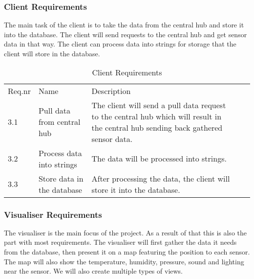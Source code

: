 \documentclass[../document]{subfiles}
\begin{document}
\subsubsection{Client Requirements}
The main task of the client is to take the data from the central hub and store it into the database. The client will send requests to the central hub and get sensor data in that way. The client can process data into strings for storage that the client will store in the database.

\begin{table}[H]
\caption{Client Requirements}
\centering
\begin{tabularx}{\textwidth}{|l|X|X|l|X|}
\hline
\\ \hline Req.nr
&Name
&Description
\\ \hline3.1
&Pull data from central hub
&The client will send a pull data request to the central hub which will result in the central hub sending back gathered sensor data.
\\ \hline3.2
&Process data into strings
&The data will be processed into strings.
\\ \hline3.3
&Store data in the database
&After processing the data, the client will store it into the database.
\\ \hline 
\end{tabularx}
\end{table}

\subsubsection{Visualiser Requirements}
The visualiser is the main focus of the project. As a result of that this is also the part with most requirements. The visualiser will first gather the data it needs from the database, then present it on a map featuring the position to each sensor. The map will also show the temperature, humidity, pressure, sound and lighting near the sensor. We will also create multiple types of views.
\end{document}
